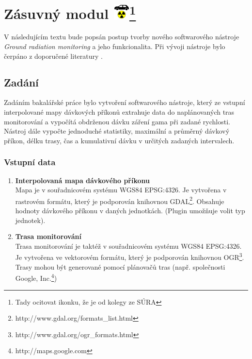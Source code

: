 \chapter[Zásuvný modul]{Zásuvný modul \includegraphics[scale=0.65]{./pictures/ikonka.png}\footnote{Tady ocitovat ikonku, že je od kolegy ze SÚRA}}
\label{4-plugin}

V následujícím textu bude popsán postup tvorby nového softwarového nástroje \textit{Ground radiation monitoring} a jeho funkcionalita. Při vývoji nástroje bylo čerpáno z doporučené literatury \cite{masteringQgis}\cite{diveIntoPython}\cite{rapidPyQt}. 

\section{Zadání}
Zadáním bakalářské práce bylo vytvoření softwarového nástroje, který ze vstupní interpolované mapy dávkových příkonů extrahuje data do naplánovaných tras monitorování a vypočítá obdrženou dávku záření gama při zadané rychlosti. Nástroj dále vypočte jednoduché statistiky, maximální a průměrný dávkový příkon, délku trasy, čas a kumulativní dávku v určitých zadaných intervalech.

\subsection{Vstupní data}
\label{subsec:vstupniData}
\begin{enumerate}
	\item \textbf{Interpolovaná mapa dávkového příkonu} \\
	Mapa je v souřadnicovém systému WGS84 EPSG:4326. Je vytvořena v rastrovém formátu, který je podporován knihovnou GDAL\footnote{http://www.gdal.org/formats\_list.html}. Obsahuje hodnoty dávkového příkonu v daných jednotkách. (Plugin umožňuje volit typ jednotek).  
	\item \textbf{Trasa monitorování} \\
	Trasa monitorování je taktéž v souřadnicovém systému WGS84 EPSG:4326. Je vytvořena ve vektorovém formátu, který je podporován knihovnou OGR\footnote{http://www.gdal.org/ogr\_formats.html}. Trasy mohou být generované pomocí plánovačů tras (např. společnosti Google, Inc.\footnote{http://maps.google.com}) 
\end{enumerate}

